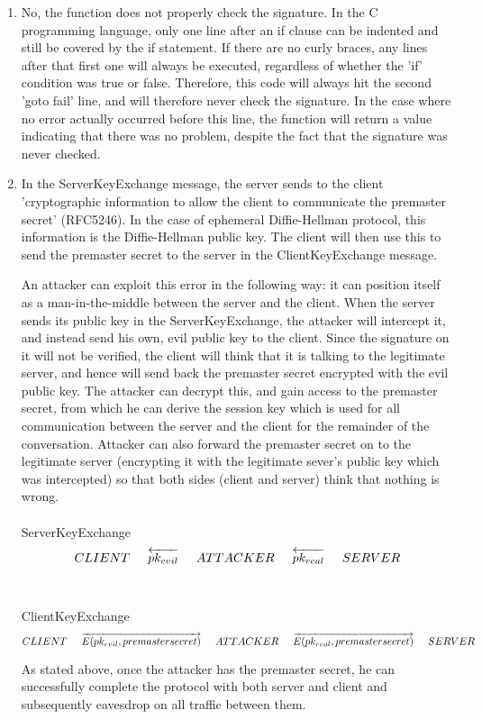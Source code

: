 \documentclass{article}
\begin{document}
\begin{enumerate}
\item %
No, the function does not properly check the signature. In the C programming language, only one line after an if clause can be indented and still be covered by the if statement. If there are no curly braces, any lines after that first one will always be executed, regardless of whether the 'if' condition was true or false. Therefore, this code will always hit the second 'goto fail' line, and will therefore never check the signature. In the case where no error actually occurred before this line, the function will return a value indicating that there was no problem, despite the fact that the signature was never checked.
\item %
In the ServerKeyExchange message, the server sends to the client 'cryptographic information to allow the client to communicate the premaster secret' (RFC5246). In the case of ephemeral Diffie-Hellman protocol, this information is the Diffie-Hellman public key. The client will then use this to send the premaster secret to the server in the ClientKeyExchange message. 

An attacker can exploit this error in the following way: it can position itself as a man-in-the-middle between the server and the client. When the server sends its public key in the ServerKeyExchange, the attacker will intercept it, and instead send his own, evil public key to the client. Since the signature on it will not be verified, the client will think that it is talking to the legitimate server, and hence will send back the premaster secret encrypted with the evil public key. The attacker can decrypt this, and gain access to the premaster secret, from which he can derive the session key which is used for all communication between the server and the client for the remainder of the conversation. Attacker can also forward the premaster secret on to the legitimate server (encrypting it with the legitimate sever's public key which was intercepted) so that both sides (client and server) think that nothing is wrong.
\\
\\
ServerKeyExchange
$$CLIENT \hspace{5 mm} \overleftarrow{pk_{evil}}   \hspace{5 mm} ATTACKER  \hspace{5 mm} \overleftarrow{pk_{real}}  \hspace{5 mm}   SERVER$$
\\
\\
ClientKeyExchange
$$CLIENT \hspace{5 mm} \overrightarrow{E(pk_{evil}, premaster secret)}   \hspace{5 mm} ATTACKER  \hspace{5 mm} \overrightarrow{E(pk_{real}, premaster secret)}  \hspace{5 mm}   SERVER$$

As stated above, once the attacker has the premaster secret, he can successfully complete the protocol with both server and client and subsequently eavesdrop on all traffic between them.

\end{enumerate}
\end{document}

